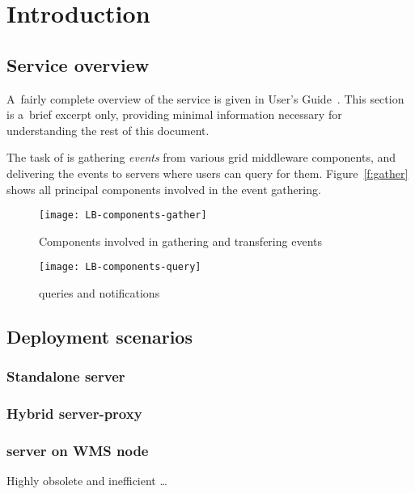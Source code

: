 \section{Introduction}

\subsection{Service overview}

A~fairly complete overview of the \LB service is given in \LB User's Guide~\cite{lbug}.
This section is a~brief excerpt only, providing minimal information necessary for
understanding the rest of this document.

The task of \LB is gathering \emph{\LB events} from various grid middleware components,
and delivering the events to \LB servers where users can query for them.
Figure~\ref{f:gather} shows all principal components involved in the event gathering.

\begin{figure}
\centering
\texttt{[image: LB-components-gather]}
\caption{Components involved in gathering and transfering \LB events}
\end{figure}

\begin{figure}
\centering
\texttt{[image: LB-components-query]}
\caption{\LB queries and notifications}
\end{figure}




\subsection{Deployment scenarios}

\subsubsection{Standalone \LB server}

\subsubsection{Hybrid \LB server-proxy}

\subsubsection{\LB server on WMS node}
Highly obsolete and inefficient \dots
